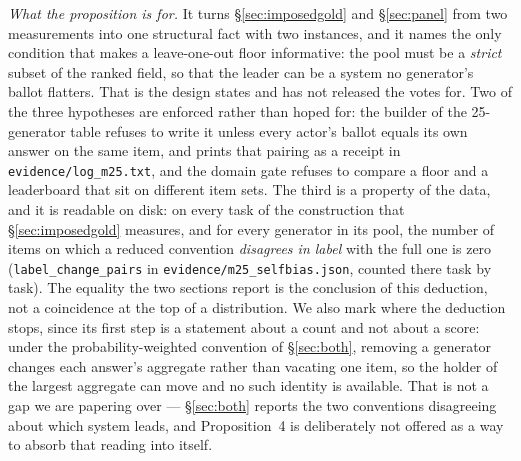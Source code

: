\documentclass{article}
\newcommand{\ids}[1]{\texttt{\small #1}} %
\begin{document}
\emph{What the proposition is for.} It turns \S\ref{sec:imposedgold} and \S\ref{sec:panel} from two measurements into one structural fact with two instances, and it names the only condition that makes a leave-one-out floor informative: the pool must be a \emph{strict} subset of the ranked field, so that the leader can be a system no generator's ballot flatters. That is the design \cite{liu2025imperfect} states and has not released the votes for. Two of the three hypotheses are enforced rather than hoped for: the builder of the 25-generator table refuses to write it unless every actor's ballot equals its own answer on the same item, and prints that pairing as a receipt in \ids{evidence/log\_m25.txt}, and the domain gate refuses to compare a floor and a leaderboard that sit on different item sets. The third is a property of the data, and it is readable on disk: on every task of the construction that \S\ref{sec:imposedgold} measures, and for every generator in its pool, the number of items on which a reduced convention \emph{disagrees in label} with the full one is zero (\texttt{label\_change\_pairs} in \ids{evidence/m25\_selfbias.json}, counted there task by task). The equality the two sections report is the conclusion of this deduction, not a coincidence at the top of a distribution. We also mark where
the deduction stops, since its first step is a statement about a count and not about a score: under the probability-weighted convention of
\S\ref{sec:both}, removing a generator changes each answer's aggregate rather than vacating one item, so the holder of the largest aggregate
can move and no such identity is available. That is not a gap we are papering over --- \S\ref{sec:both} reports the two conventions
disagreeing about which system leads, and Proposition~4 is deliberately not offered as a way to absorb that reading into itself.
\end{document}
